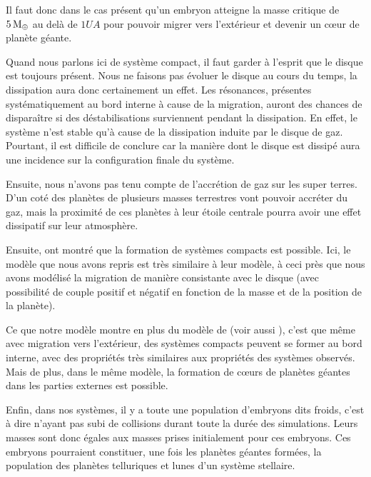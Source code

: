 Il faut donc dans le cas présent qu'un embryon atteigne la masse critique de $5\mathrm{\thinspace M_\oplus}$ au delà de $1\unit{UA}$ pour pouvoir migrer vers l'extérieur et devenir un cœur de planète géante.

\bigskip

Quand nous parlons ici de système compact, il faut garder à l'esprit que le disque est toujours présent. Nous ne faisons pas évoluer le disque au cours du temps, la dissipation aura donc certainement un effet. Les résonances, présentes systématiquement au bord interne à cause de la migration, auront des chances de disparaître si des déstabilisations surviennent pendant la dissipation. En effet, le système n'est stable qu'à cause de la dissipation induite par le disque de gaz. Pourtant, il est difficile de conclure car la manière dont le disque est dissipé aura une incidence sur la configuration finale du système. 

Ensuite, nous n'avons pas tenu compte de l'accrétion de gaz sur les super terres. D'un coté des planètes de plusieurs masses terrestres vont pouvoir accréter du gaz, mais la proximité de ces planètes à leur étoile centrale pourra avoir une effet dissipatif sur leur atmosphère. 

Ensuite, \cite{terquem2007migration} ont montré que la formation de systèmes compacts est possible. Ici, le modèle que nous avons repris est très similaire à leur modèle, à ceci près que nous avons modélisé la migration de manière consistante avec le disque (avec possibilité de couple positif et négatif en fonction de la masse et de la position de la planète). 

Ce que notre modèle montre en plus du modèle de \cite{terquem2007migration} (voir aussi \cite{ogihara2007accretion,
cresswell2008three}), c'est que même avec migration vers l'extérieur, des systèmes compacts peuvent se former au bord interne,
avec des propriétés très similaires aux propriétés des systèmes observés. Mais de plus, dans le même modèle, la formation de
cœurs de planètes géantes dans les parties externes est possible. 

\bigskip

Enfin, dans nos systèmes, il y a toute une population d'embryons dits froids, c'est à dire n'ayant pas subi de collisions durant toute la durée des simulations. Leurs masses sont donc égales aux masses prises initialement pour ces embryons. Ces embryons pourraient constituer, une fois les planètes géantes formées, la population des planètes telluriques et lunes d'un système stellaire. 